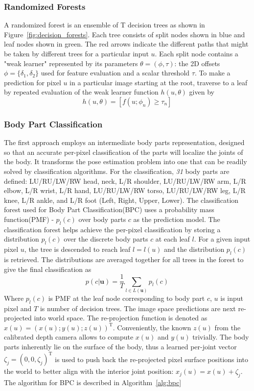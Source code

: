 \subsubsection{Randomized Forests} A randomized forest\cite{breiman2001random} is an ensemble of T decision trees as shown in Figure~\ref{fig:decision_forests}. Each tree consists of split nodes shown in blue and leaf nodes shown in green. The red arrows indicate the different paths that might be taken by different trees for a particular input $u$. Each split node contains a "weak learner" represented by its parameters $\theta = (\phi,\tau)$: the 2D offsets $\phi=\lbrace{ \delta_1,\delta_2 \rbrace}$ used for feature evaluation and a scalar threshold $\tau$. To make a prediction for pixel $u$ in a particular image starting at the root, traverse to a leaf by repeated evaluation of the weak learner function $h(u,\theta)$ given by
\begin{equation}
\label{eqn:weak_learner}
h(u,\theta) = [ f(u;\phi_n) \geq \tau_n ]
\end{equation} 
 
\subsubsection{Body Part Classification} The first approach employs an intermediate body parts representation, designed so that an accurate per-pixel classification of the parts will localize the joints of the body. It transforms the pose estimation problem into one that can be readily solved by classification algorithms. For the classification, \emph{31} body parts are defined: LU/RU/LW/RW head, neck, L/R shoulder, LU/RU/LW/RW arm, L/R elbow, L/R wrist, L/R hand, LU/RU/LW/RW torso, LU/RU/LW/RW leg, L/R knee, L/R ankle, and L/R foot (Left, Right, Upper, Lower). The classification forest used for Body Part Classification(BPC) uses a probability mass function(PMF) - $p_l(c)$ over body parts $c$ as the prediction model. The classification forest helps achieve the per-pixel classification by storing a distribution $p_l(c)$ over the discrete body parts $c$ at each leaf $l$. For a given input pixel $u$, the tree is descended to reach leaf $l = l(u)$ and the distribution $p_l(c)$ is retrieved. The distributions are averaged together for all trees in the forest to give the final classification as
\begin{equation}
p(c\vert \textbf{u}) = \frac{1}{T}\sum_{l\in L(\textbf{u})} p_l(c)
\label{eqn:bpc_dist}
\end{equation}
Where $p_l(c)$ is PMF at the leaf node corresponding to body part $c$, $u$ is input pixel and $T$ is number of decision trees. The image space predictions are next re-projected into world space. The re-projection function is denoted as $x(u) = (x(u); y(u); z(u))^\text{T}$. Conveniently, the known $z(u)$ from the calibrated depth camera allows to compute $x(u)$ and $y(u)$ trivially. The body parts inherently lie on the surface of the body, thus a learned per-joint vector ${\zeta_j} = (0,0,\zeta_j)^\text{T}$ is used to push back the re-projected pixel surface positions into the world to better align with the interior joint position: $x_j(u) = x(u) + {\zeta_j}$. The algorithm for BPC is described in Algorithm~\ref{alg:bpc} \\

